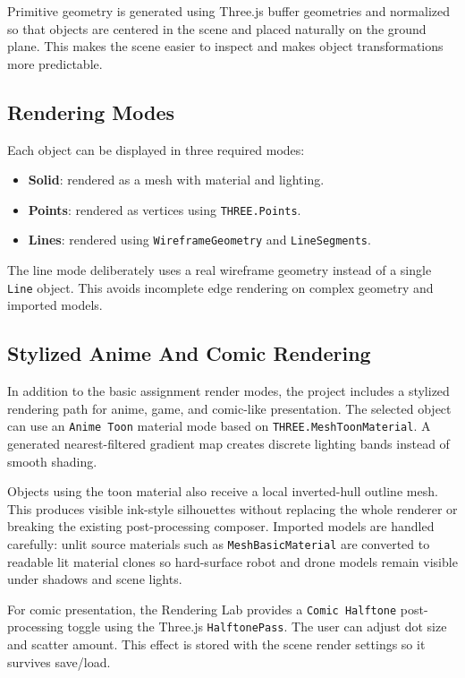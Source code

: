 \documentclass[12pt,a4paper]{article}
\begin{document}
Primitive geometry is generated using Three.js buffer geometries and normalized
so that objects are centered in the scene and placed naturally on the ground
plane. This makes the scene easier to inspect and makes object transformations
more predictable.

\subsection{Rendering Modes}

Each object can be displayed in three required modes:
\begin{itemize}
  \item \textbf{Solid}: rendered as a mesh with material and lighting.
  \item \textbf{Points}: rendered as vertices using \texttt{THREE.Points}.
  \item \textbf{Lines}: rendered using \texttt{WireframeGeometry} and
  \texttt{LineSegments}.
\end{itemize}

The line mode deliberately uses a real wireframe geometry instead of a single
\texttt{Line} object. This avoids incomplete edge rendering on complex geometry
and imported models.

\subsection{Stylized Anime And Comic Rendering}

In addition to the basic assignment render modes, the project includes a
stylized rendering path for anime, game, and comic-like presentation. The
selected object can use an \texttt{Anime Toon} material mode based on
\texttt{THREE.MeshToonMaterial}. A generated nearest-filtered gradient map
creates discrete lighting bands instead of smooth shading.

Objects using the toon material also receive a local inverted-hull outline mesh.
This produces visible ink-style silhouettes without replacing the whole renderer
or breaking the existing post-processing composer. Imported models are handled
carefully: unlit source materials such as \texttt{MeshBasicMaterial} are
converted to readable lit material clones so hard-surface robot and drone models
remain visible under shadows and scene lights.

For comic presentation, the Rendering Lab provides a \texttt{Comic Halftone}
post-processing toggle using the Three.js \texttt{HalftonePass}. The user can
adjust dot size and scatter amount. This effect is stored with the scene render
settings so it survives save/load.
\end{document}
